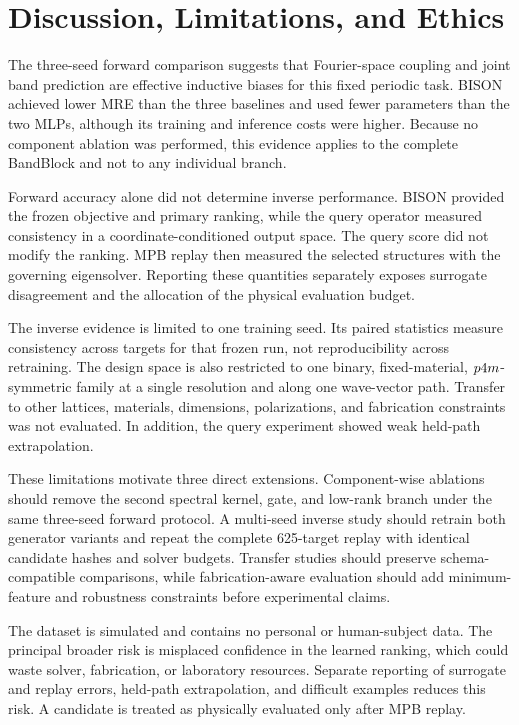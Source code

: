
\section{Discussion, Limitations, and Ethics}

The three-seed forward comparison suggests that Fourier-space coupling and
joint band prediction are effective inductive biases for this fixed periodic
task. BISON achieved lower MRE than the three baselines and used fewer
parameters than the two MLPs, although its training and inference costs were
higher. Because no component ablation was performed, this evidence applies to
the complete BandBlock and not to any individual branch.

Forward accuracy alone did not determine inverse performance. BISON provided
the frozen objective and primary ranking, while the query operator measured
consistency in a coordinate-conditioned output space. The query
score did not modify the ranking. MPB replay then measured the selected
structures with the governing eigensolver. Reporting these quantities
separately exposes surrogate disagreement and the allocation of the physical
evaluation budget.

The inverse evidence is limited to one training seed. Its paired statistics
measure consistency across targets for that frozen run, not reproducibility
across retraining. The design space is also restricted to one binary,
fixed-material, \(p4m\)-symmetric family at a single resolution and along
one wave-vector path. Transfer to other lattices, materials, dimensions,
polarizations, and fabrication constraints was not evaluated. In addition,
the query experiment showed weak held-path extrapolation.

These limitations motivate three direct extensions. Component-wise ablations
should remove the second spectral kernel, gate, and low-rank branch under the
same three-seed forward protocol. A multi-seed inverse study should retrain both
generator variants and repeat the complete 625-target replay with identical
candidate hashes and solver budgets. Transfer studies should preserve
schema-compatible comparisons, while fabrication-aware evaluation should add
minimum-feature and robustness constraints before experimental claims.

The dataset is simulated and contains no personal or human-subject data. The
principal broader risk is misplaced confidence in the learned ranking, which
could waste solver, fabrication, or laboratory resources. Separate reporting
of surrogate and replay errors, held-path extrapolation, and difficult examples
reduces this risk. A candidate is treated as physically evaluated only after
MPB replay.
